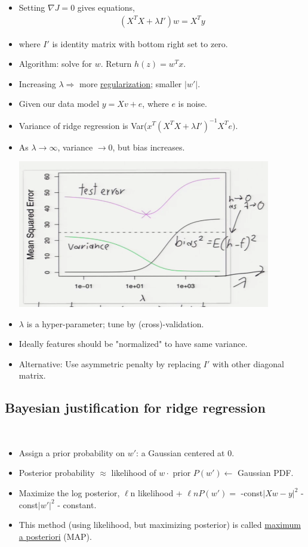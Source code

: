 \documentclass[10pt]{article}
\begin{document}
\begin{itemize}
\begin{center}
			\end{center}
		\item Setting $\nabla J = 0$ gives equations,
			\begin{align*}
				(X^{T}X + \lambda I')w = X^{T}y
			\end{align*} 
		\item where $I'$ is identity matrix with bottom right set to zero.
		\item Algorithm: solve for $w$. Return $h(z) = w^{T}x$.
		\item Increasing $\lambda \Rightarrow$ more \underline{regularization}; smaller $|w'|$.
		\item Given our data model $y = Xv + e$, where $e$ is noise.
		\item Variance of ridge regression is Var($x^{T}(X^{T}X + \lambda I')^{-1}X^{T}e)$.
		\item As $\lambda \rightarrow \infty$, variance $\rightarrow 0$, but bias increases.
			\begin{center}
				\includegraphics[scale=0.5]{images/lambdabiasvsvariance}
			\end{center}
		\item $\lambda$ is a hyper-parameter; tune by (cross)-validation.
		\item Ideally features should be "normalized" to have same variance.
		\item Alternative: Use asymmetric penalty by replacing $I'$ with other diagonal matrix.
	\end{itemize} 
	
	\subsection*{Bayesian justification for ridge regression}
	\
	\begin{itemize}
		\item Assign a prior probability on $w'$: a Gaussian centered at 0.
		\item Posterior probability $\approx$ likelihood of $w \cdot $ prior $P(w') \leftarrow$ Gaussian PDF. 
		\item Maximize the log posterior, $\ell$n likelihood + $\ell n P(w') =$ -const$|Xw-y|^{2}$ - const$|w'|^{2}$ - constant.
		\item This method (using likelihood, but maximizing posterior) is called \underline{maximum a posteriori} (MAP).
	\end{itemize}
	
\end{document}

